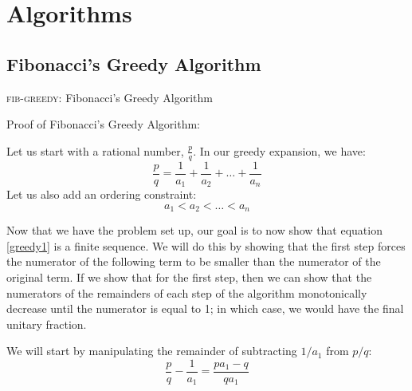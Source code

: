 \documentclass[paper=a4, fontsize=11pt]{scrartcl}
\numberwithin{equation}{section}	 %
\numberwithin{figure}{section}	 %
\numberwithin{table}{section}	 %
\begin{document}
\section{Algorithms}
\subsection{Fibonacci's Greedy Algorithm}
\begin{algorithm}[H]

\caption{\textsc{fib-greedy}: Fibonacci's Greedy Algorithm}
\label{alg:one}
\end{algorithm}
Proof of Fibonacci’s Greedy Algorithm:

Let us start with a rational number, $\frac{p}{q}$. In our greedy expansion, we have:
\begin{equation}\label{greedy1}
	\frac{p}{q} = \frac{1}{a_1} + \frac{1}{a_2} + \ldots + \frac{1}{a_n}
\end{equation}
Let us also add an ordering constraint:
\begin{equation}
	a_1 < a_2 < \ldots < a_n
\end{equation}

Now that we have the problem set up, our goal is to now show that equation \ref{greedy1} is a finite sequence. We will do this by showing that the first step forces the numerator of the following term to be smaller than the numerator of the original term. If we show that for the first step, then we can show that the numerators of the remainders of each step of the algorithm monotonically decrease until the numerator is equal to 1; in which case, we would have the final unitary fraction.

We will start by manipulating the remainder of subtracting $1/a_1$ from $p/q$:
\begin{equation}
	\frac{p}{q} - \frac{1}{a_1} = \frac{pa_1 - q}{qa_1}
\end{equation}
\end{document}
